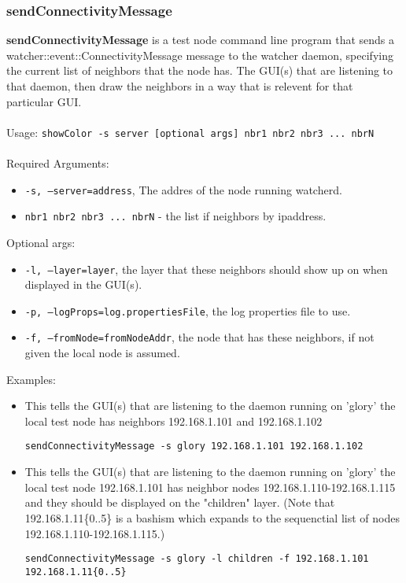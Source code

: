 \newpage
\label{sendConnectivityMessage}
\subsubsection{sendConnectivityMessage}
{\bf sendConnectivityMessage} is a test node command line program that sends a watcher::event::ConnectivityMessage message to the watcher daemon, specifying the current list of neighbors that the node has. 
The GUI(s) that are listening to that daemon, then draw the neighbors in a way that is relevent for that particular GUI.
\\\\
Usage: 
{\tt showColor -s server [optional args] nbr1 nbr2 nbr3 ... nbrN}
\\\\
Required Arguments: 
\begin{itemize}
\item {\tt -s, --server=address}, The addres of the node running watcherd.
\item {\tt nbr1 nbr2 nbr3 ... nbrN} - the list if neighbors by ipaddress.
\end{itemize}
Optional args:
\begin{itemize}
\item {\tt -l, --layer=layer}, the layer that these neighbors should show up on when displayed in the GUI(s).
\item {\tt -p, --logProps=log.propertiesFile}, the log properties file to use.
\item {\tt -f, --fromNode=fromNodeAddr}, the node that has these neighbors, if not given the local node is assumed.
\end{itemize}
Examples:
\begin{itemize}

\item This tells the GUI(s) that are listening to the daemon running on 'glory' the local test node has neighbors 192.168.1.101 and 192.168.1.102

{\tt sendConnectivityMessage -s glory 192.168.1.101 192.168.1.102}

\item This tells the GUI(s) that are listening to the daemon running on 'glory' the local test node 192.168.1.101 has neighbor nodes 192.168.1.110-192.168.1.115 and they should be displayed on the "children" layer. (Note that 192.168.1.11\{0..5\} is a bashism which expands to the sequenctial list of nodes 192.168.1.110-192.168.1.115.) 

{\tt sendConnectivityMessage -s glory -l children -f 192.168.1.101 192.168.1.11\{0..5\}}

\end{itemize}
